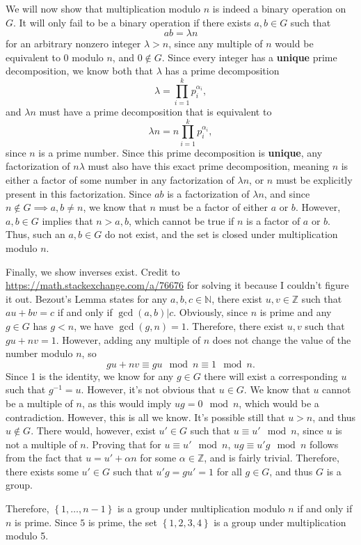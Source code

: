 \documentclass[11pt, letterpaper]{report}
\renewenvironment{solution}[1][]{\begin{bwaaa}}{\end{bwaaa}\vspace{10pt}}
\begin{document}
\begin{solution}
We will now show that multiplication modulo $n$ is indeed a binary operation on $G$. It will only fail to be a binary operation if there exists $a,b\in G$ such that
\[
	ab=\lambda n
\]
for an arbitrary nonzero integer $\lambda >n$, since any multiple of $n$ would be equivalent to $0$ modulo $n$, and $0\notin G$. Since every integer has a \textbf{unique} prime decomposition, we know both that $\lambda $ has a prime decomposition
\[
	\lambda =\prod_{i=1}^{k} p_i^{\alpha_i} 
,\]
and $\lambda n$ must have a prime decomposition that is equivalent to
\[
	\lambda n=n \prod_{i=1}^{k} p_i^{\alpha_i} 
,\]
since $n$ is a prime number. Since this prime decomposition is \textbf{unique}, any factorization of $n\lambda $ must also have this exact prime decomposition, meaning $n$ is either a factor of some number in any factorization of $\lambda n$, or $n$ must be explicitly present in this factorization. Since $ab$ is a factorization of $\lambda n$, and since $n\notin G \implies a,b\neq n$, we know that $n$ must be a factor of either $a$ or $b$. However, $a,b\in G$ implies that $n>a,b$, which cannot be true if $n$ is a factor of $a$ or $b$. Thus, such an $a,b\in G$ do not exist, and the set is closed under multiplication modulo $n$.

Finally, we show inverses exist. Credit to \url{https://math.stackexchange.com/a/76676} for solving it because I couldn't figure it out. Bezout's Lemma states for any $a,b,c\in\mathbb{N}$, there exist $u,v\in\mathbb{Z}$ such that $au+bv=c$ if and only if $\operatorname{gcd}(a,b) |c$. Obviously, since $n$ is prime and any $g\in G$ has $g<n$, we have $\operatorname{gcd}(g,n) =1$. Therefore, there exist $u, v$ such that $gu+nv=1$. However, adding any multiple of $n$ does not change the value of the number modulo $n$, so
\[
	gu+nv\equiv gu\mod n\equiv 1\mod n
.\]
Since 1 is the identity, we know for any $g\in G$ there will exist a corresponding $u$ such that $g^{-1}=u$. However, it's not obvious that $u\in G.$ We know that $u$ cannot be a multiple of  $n$, as this would imply $ug=0\mod n$, which would be a contradiction. However, this is all we know. It's possible still that $u>n$, and thus $u\notin G$. There would, however, exist $u'\in G$ such that $u\equiv u'\mod n$, since $u$ is not a multiple of $n$. Proving that for $u\equiv u'\mod n$, $ug\equiv u'g\mod n$ follows from the fact that $u=u'+\alpha n$ for some $\alpha \in\mathbb{Z}$, and is fairly trivial. Therefore, there exists some $u'\in G$ such that $u'g=gu'=1$ for all $g\in G$, and thus $G$ is a group.

Therefore, $\left\{ 1,\ldots,n-1 \right\} $ is a group under multiplication modulo $n$ if and only if $n$ is prime. Since $5$ is prime, the set $\left\{ 1,2,3,4 \right\} $ is a group under multiplication modulo 5.


\end{solution}
\end{document}
